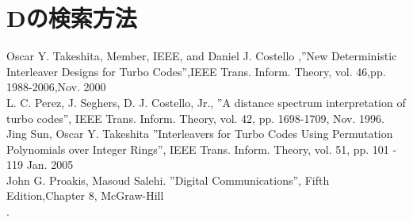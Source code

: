\documentclass[twoside]{jsarticle}
\begin{document}
\section{Dの検索方法}

\begin{thebibliography}{}
    Oscar Y. Takeshita, Member, IEEE, and Daniel J. Costello ,''New Deterministic Interleaver Designs for Turbo Codes'',IEEE Trans. Inform. Theory, vol. 46,pp. 1988-2006,Nov. 2000\\
   L. C. Perez, J. Seghers, D. J. Costello, Jr., ''A distance spectrum interpretation of turbo codes'', IEEE Trans. Inform. Theory, vol. 42, pp. 1698-1709, Nov. 1996.\\
 Jing Sun, Oscar Y. Takeshita ”Interleavers for Turbo Codes Using Permutation Polynomials over Integer Rings”, IEEE Trans. Inform. Theory, vol. 51,
pp. 101 - 119 Jan. 2005\\
 John G. Proakis, Masoud Salehi. ''Digital Communications'', Fifth Edition,Chapter 8, McGraw-Hill\\.
\end{thebibliography}
\end{document}
